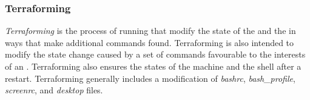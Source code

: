 \subsubsection{Terraforming}\label{terraform}\label{terraforms}\label{terraforming}

\emph{Terraforming} is the process of running  that modify the state of the  and the  in ways that make additional commands found. Terraforming is also intended to modify the state change caused by a set of commands favourable to the interests of an . Terraforming also ensures the states of the machine and the shell after a restart. Terraforming generally includes a modification of \emph{bashrc}, \emph{bash\_profile}, \emph{screenrc}, and \emph{desktop} files.